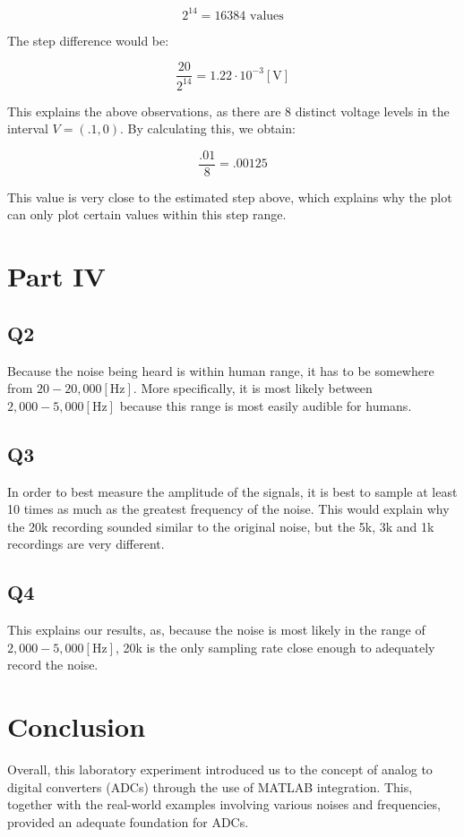 \documentclass[
	letterpaper, %
	10pt, %
]{CSUniSchoolLabReport}
\begin{document}
  $$2^{14}=16384\text{ values}$$

  The step difference would be:

  $$\dfrac{20}{2^{14}}=1.22\cdot10^{-3}[\si{\volt}]$$

  This explains the above observations, as there are 8 distinct voltage levels in the interval $V=(.1,0)$. By calculating this, we obtain:

  $$\frac{.01}{8}=.00125$$

  This value is very close to the estimated step above, which explains why the plot can only plot certain values within this step range.

\section{Part IV}

\subsection{Q2} Because the noise being heard is within human range, it has to be somewhere from $20-20,000[\si{\hertz}]$. More specifically, it is most likely between $2,000-5,000[\si{\hertz}]$ because this range is most easily audible for humans.

\subsection{Q3} In order to best measure the amplitude of the signals, it is best to sample at least 10 times as much as the greatest frequency of the noise. This would explain why the 20k recording sounded similar to the original noise, but the 5k, 3k and 1k recordings are very different.

\subsection{Q4} This explains our results, as, because the noise is most likely in the range of $2,000-5,000[\si{\hertz}]$, 20k is the only sampling rate close enough to adequately record the noise.

\section{Conclusion}

Overall, this laboratory experiment introduced us to the concept of analog to digital converters (ADCs) through the use of MATLAB integration. This, together with the real-world examples involving various noises and frequencies, provided an adequate foundation for ADCs.
\end{document}
